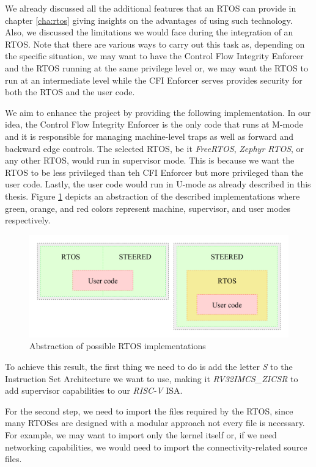 We already discussed all the additional features that an RTOS can provide in
chapter \ref{cha:rtos} giving insights on the advantages of using such
technology. Also, we discussed the limitations we would face during the
integration of an RTOS. Note that there are various ways to carry out this task as,
depending on the specific situation, we may want to have the Control Flow Integrity
Enforcer and the RTOS running at the same privilege level or, we may want the
RTOS to run at an intermediate level while the CFI Enforcer serves provides
security for both the RTOS and the user code.

We aim to enhance the project by providing the following implementation. In our idea,
the Control Flow Integrity Enforcer is the only code that runs at M-mode and it
is responsible for managing machine-level traps as well as forward and backward
edge controls. The selected RTOS, be it \textit{FreeRTOS}, \textit{Zephyr RTOS},
or any other RTOS, would run in supervisor mode. This is because we want the
RTOS to be less privileged than teh CFI Enforcer but more privileged than the
user code. Lastly, the user code would run in U-mode as already described in
this thesis. Figure \ref{fig:rtos} depicts an abstraction of the described implementations
where green, orange, and red colors represent machine, supervisor, and user modes
respectively. \\
\begin{figure}[htbp]
  \centering
  \includegraphics[width=\linewidth]{images/rtos.png}
  \caption{Abstraction of possible RTOS implementations}
  \label{fig:rtos}
\end{figure}

To achieve this result, the first thing we need to do is add the letter \textit{S}
to the Instruction Set Architecture we want to use, making it \textit{RV32IMCS\_ZICSR}
to add supervisor capabilities to our \textit{RISC-V} ISA.

For the second step, we need to import the files required by the RTOS, since
many RTOSes are designed with a modular approach not every file is necessary. For
example, we may want to import only the kernel itself or, if we need networking capabilities,
we would need to import the connectivity-related source files.

